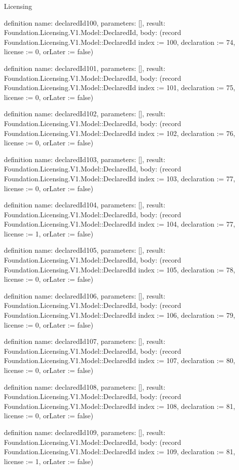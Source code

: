 \begin{lexlean}{Licensing}
\begin{semanticmodule}
definition{
  name: declaredId100,
  parameters: [],
  result: Foundation.Licensing.V1.Model::DeclaredId,
  body: (record Foundation.Licensing.V1.Model::DeclaredId {index := 100, declaration := 74, license := 0, orLater := false})
}

definition{
  name: declaredId101,
  parameters: [],
  result: Foundation.Licensing.V1.Model::DeclaredId,
  body: (record Foundation.Licensing.V1.Model::DeclaredId {index := 101, declaration := 75, license := 0, orLater := false})
}

definition{
  name: declaredId102,
  parameters: [],
  result: Foundation.Licensing.V1.Model::DeclaredId,
  body: (record Foundation.Licensing.V1.Model::DeclaredId {index := 102, declaration := 76, license := 0, orLater := false})
}

definition{
  name: declaredId103,
  parameters: [],
  result: Foundation.Licensing.V1.Model::DeclaredId,
  body: (record Foundation.Licensing.V1.Model::DeclaredId {index := 103, declaration := 77, license := 0, orLater := false})
}

definition{
  name: declaredId104,
  parameters: [],
  result: Foundation.Licensing.V1.Model::DeclaredId,
  body: (record Foundation.Licensing.V1.Model::DeclaredId {index := 104, declaration := 77, license := 1, orLater := false})
}

definition{
  name: declaredId105,
  parameters: [],
  result: Foundation.Licensing.V1.Model::DeclaredId,
  body: (record Foundation.Licensing.V1.Model::DeclaredId {index := 105, declaration := 78, license := 0, orLater := false})
}

definition{
  name: declaredId106,
  parameters: [],
  result: Foundation.Licensing.V1.Model::DeclaredId,
  body: (record Foundation.Licensing.V1.Model::DeclaredId {index := 106, declaration := 79, license := 0, orLater := false})
}

definition{
  name: declaredId107,
  parameters: [],
  result: Foundation.Licensing.V1.Model::DeclaredId,
  body: (record Foundation.Licensing.V1.Model::DeclaredId {index := 107, declaration := 80, license := 0, orLater := false})
}

definition{
  name: declaredId108,
  parameters: [],
  result: Foundation.Licensing.V1.Model::DeclaredId,
  body: (record Foundation.Licensing.V1.Model::DeclaredId {index := 108, declaration := 81, license := 0, orLater := false})
}

definition{
  name: declaredId109,
  parameters: [],
  result: Foundation.Licensing.V1.Model::DeclaredId,
  body: (record Foundation.Licensing.V1.Model::DeclaredId {index := 109, declaration := 81, license := 1, orLater := false})
}


\end{semanticmodule}
\end{lexlean}
